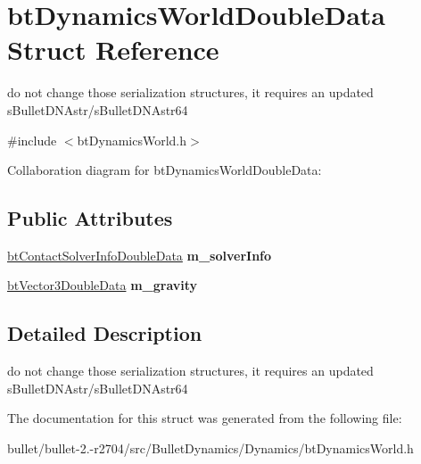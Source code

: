 \hypertarget{structbt_dynamics_world_double_data}{\section{bt\+Dynamics\+World\+Double\+Data Struct Reference}
\label{structbt_dynamics_world_double_data}
}


do not change those serialization structures, it requires an updated s\+Bullet\+D\+N\+Astr/s\+Bullet\+D\+N\+Astr64  




{\ttfamily \#include $<$bt\+Dynamics\+World.\+h$>$}



Collaboration diagram for bt\+Dynamics\+World\+Double\+Data\+:
\subsection*{Public Attributes}
\begin{DoxyCompactItemize}
\item 
\hypertarget{structbt_dynamics_world_double_data_a19f56cfeb1c80d382449e9ade28df5be}{\hyperlink{structbt_contact_solver_info_double_data}{bt\+Contact\+Solver\+Info\+Double\+Data} {\bfseries m\+\_\+solver\+Info}}\label{structbt_dynamics_world_double_data_a19f56cfeb1c80d382449e9ade28df5be}

\item 
\hypertarget{structbt_dynamics_world_double_data_af157dc55885785678726986d696a2f74}{\hyperlink{structbt_vector3_double_data}{bt\+Vector3\+Double\+Data} {\bfseries m\+\_\+gravity}}\label{structbt_dynamics_world_double_data_af157dc55885785678726986d696a2f74}

\end{DoxyCompactItemize}


\subsection{Detailed Description}
do not change those serialization structures, it requires an updated s\+Bullet\+D\+N\+Astr/s\+Bullet\+D\+N\+Astr64 

The documentation for this struct was generated from the following file\+:\begin{DoxyCompactItemize}
\item 
bullet/bullet-\/2.-\/r2704/src/\+Bullet\+Dynamics/\+Dynamics/bt\+Dynamics\+World.\+h\end{DoxyCompactItemize}
